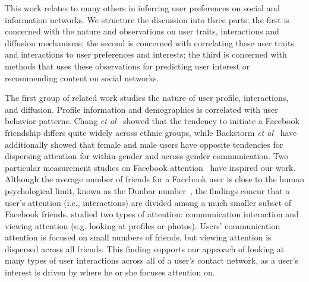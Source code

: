 

This work relates to many others in inferring user preferences on social and information networks. 
We structure the discussion into three parts: the first is concerned with the nature and observations on user traits, interactions and diffusion mechanisms; the second is concerned with correlating these user traits and interactions to user preferences and interests; %
the third is concerned with methods that uses these observations for predicting user interest or recommending content on social networks.

The first group of related work studies the nature of user profile, interactions, and diffusion.
Profile information and demographics is correlated with user behavior
patterns. Chang {\it et al}~\cite{Chang2010ethnicity} showed that the tendency to
initiate a Facebook friendship differs quite widely across ethnic
groups, while Backstorm {\it et al}~\cite{backstrom2011center} have additionally showed that female and male users have opposite tendencies for dispersing attention for within-gender and across-gender communication.
Two particular measurement studies on Facebook attention~\cite{backstrom2011center,wilson2009user} have inspired our work.  Although the average number of friends for a Facebook user is close to the human psychological limit, known as the Dunbar number~\cite{hill2003social}, the findings concur that a user's attention (i.e., interactions) are divided among a much smaller subset of Facebook friends. \cite{backstrom2011center} studied two types of attention: communication interaction and viewing attention (e.g. looking at profiles or photos). Users' communication attention is focused on small numbers of friends, but viewing attention is dispersed across all friends.
This finding supports our approach of looking at many types of user interactions across all of a user's contact network, as a user's interest is driven by where he or she focuses attention on.

